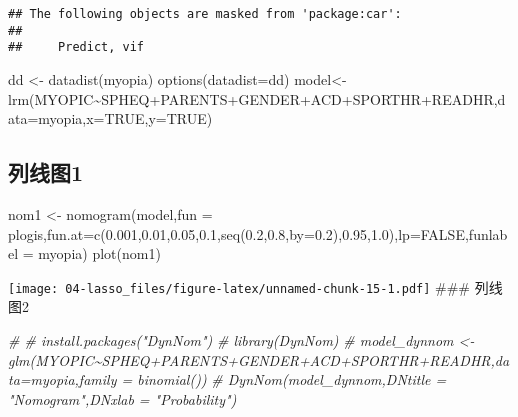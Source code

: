 \documentclass[]{ctexbook}
\newenvironment{Shaded}{\begin{snugshade}}{\end{snugshade}}
\newcommand{\AttributeTok}[1]{\textcolor[rgb]{0.77,0.63,0.00}{#1}}
\newcommand{\CommentTok}[1]{\textcolor[rgb]{0.56,0.35,0.01}{\textit{#1}}}
\newcommand{\ConstantTok}[1]{\textcolor[rgb]{0.00,0.00,0.00}{#1}}
\newcommand{\FloatTok}[1]{\textcolor[rgb]{0.00,0.00,0.81}{#1}}
\newcommand{\FunctionTok}[1]{\textcolor[rgb]{0.00,0.00,0.00}{#1}}
\newcommand{\NormalTok}[1]{#1}
\newcommand{\OtherTok}[1]{\textcolor[rgb]{0.56,0.35,0.01}{#1}}
\newcommand{\SpecialCharTok}[1]{\textcolor[rgb]{0.00,0.00,0.00}{#1}}
\newcommand{\StringTok}[1]{\textcolor[rgb]{0.31,0.60,0.02}{#1}}
\begin{document}
\begin{verbatim}
## The following objects are masked from 'package:car':
## 
##     Predict, vif
\end{verbatim}

\begin{Shaded}
\begin{Highlighting}[]
\NormalTok{dd }\OtherTok{\textless{}{-}} \FunctionTok{datadist}\NormalTok{(myopia)}
\FunctionTok{options}\NormalTok{(}\AttributeTok{datadist=}\NormalTok{dd)}
\NormalTok{model}\OtherTok{\textless{}{-}} \FunctionTok{lrm}\NormalTok{(MYOPIC}\SpecialCharTok{\textasciitilde{}}\NormalTok{SPHEQ}\SpecialCharTok{+}\NormalTok{PARENTS}\SpecialCharTok{+}\NormalTok{GENDER}\SpecialCharTok{+}\NormalTok{ACD}\SpecialCharTok{+}\NormalTok{SPORTHR}\SpecialCharTok{+}\NormalTok{READHR,}\AttributeTok{data=}\NormalTok{myopia,}\AttributeTok{x=}\ConstantTok{TRUE}\NormalTok{,}\AttributeTok{y=}\ConstantTok{TRUE}\NormalTok{)}
\end{Highlighting}
\end{Shaded}

\hypertarget{ux5217ux7ebfux56fe1}{%
\subsection{列线图1}\label{ux5217ux7ebfux56fe1}}

\begin{Shaded}
\begin{Highlighting}[]
\NormalTok{nom1 }\OtherTok{\textless{}{-}} \FunctionTok{nomogram}\NormalTok{(model,}\AttributeTok{fun =}\NormalTok{ plogis,}\AttributeTok{fun.at=}\FunctionTok{c}\NormalTok{(}\FloatTok{0.001}\NormalTok{,}\FloatTok{0.01}\NormalTok{,}\FloatTok{0.05}\NormalTok{,}\FloatTok{0.1}\NormalTok{,}\FunctionTok{seq}\NormalTok{(}\FloatTok{0.2}\NormalTok{,}\FloatTok{0.8}\NormalTok{,}\AttributeTok{by=}\FloatTok{0.2}\NormalTok{),}\FloatTok{0.95}\NormalTok{,}\FloatTok{1.0}\NormalTok{),}\AttributeTok{lp=}\ConstantTok{FALSE}\NormalTok{,}\AttributeTok{funlabel =} \StringTok{\textquotesingle{}myopia\textquotesingle{}}\NormalTok{)}
\FunctionTok{plot}\NormalTok{(nom1)}
\end{Highlighting}
\end{Shaded}

\texttt{[image: 04-lasso\_files/figure-latex/unnamed-chunk-15-1.pdf]}
\#\#\# 列线图2

\begin{Shaded}
\begin{Highlighting}[]
\CommentTok{\# \# install.packages("DynNom")}
\CommentTok{\# library(DynNom)}
\CommentTok{\# model\_dynnom \textless{}{-} glm(MYOPIC\textasciitilde{}SPHEQ+PARENTS+GENDER+ACD+SPORTHR+READHR,data=myopia,family = binomial())}
\CommentTok{\# DynNom(model\_dynnom,DNtitle = "Nomogram",DNxlab = "Probability")}
\end{Highlighting}
\end{Shaded}
\end{document}
